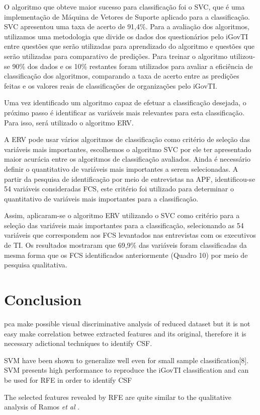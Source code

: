 O algoritmo que obteve maior sucesso para classificação foi o SVC, que é uma implementação de Máquina de Vetores de Suporte aplicado para a classificação. SVC apresentou uma taxa de acerto de 91,4\%. Para a avaliação dos algoritmos, utilizamos uma metodologia que divide os dados dos questionários pelo iGovTI entre questões que serão utilizadas para aprendizado do algoritmo e questões que serão utilizadas para comparativo de predições. Para treinar o algoritmo utilizou-se 90\% dos dados e os 10\% restantes foram utilizados para avaliar a eficiência de classificação dos algoritmos, comparando a taxa de acerto entre as predições feitas e os valores reais de classificações de organizações pelo iGovTI. 

Uma vez identificado um algoritmo capaz de efetuar a classificação desejada, o próximo passo é identificar as variáveis mais relevantes para esta classificação. Para isso, será utilizado o algoritmo ERV. 

A ERV pode usar vários algoritmos de classificação como critério de seleção das variáveis mais importantes, escolhemos o algoritmo SVC por ele ter apresentado maior acurácia entre os algoritmos de classificação avaliados. Ainda é necessário definir o quantitativo de variáveis mais importantes a serem selecionadas. A partir da pesquisa de identificação por meio de entrevistas na APF, identificou-se 54 variáveis consideradas FCS, este critério foi utilizado para determinar o quantitativo de variáveis mais importantes para a classificação.

Assim, aplicaram-se o algoritmo ERV utilizando o SVC como critério para a seleção das variáveis mais importantes para a classificação, selecionando as 54 variáveis que correspondem aos FCS levantados nas entrevistas com os executivos de TI. Os resultados mostraram que 69,9\% das variáveis foram classificadas da mesma forma que os FCS identificados anteriormente (Quadro 10) por meio de pesquisa qualitativa.

\section{Conclusion}

pca make possible visual discriminative analysis of reduced dataset but it is not easy make correlation betwee extracted features and its original, therefore it is necessary adictional techniques to identify CSF.

SVM have been shown to generalize well even for small sample classification[8]. SVM presents high performance to reproduce the iGovTI classification and can be used for RFE in order to identify CSF

The selected features revealed by RFE are quite similar to the qualitative analysis of Ramos \emph{et al} \cite{ramos2016information}.